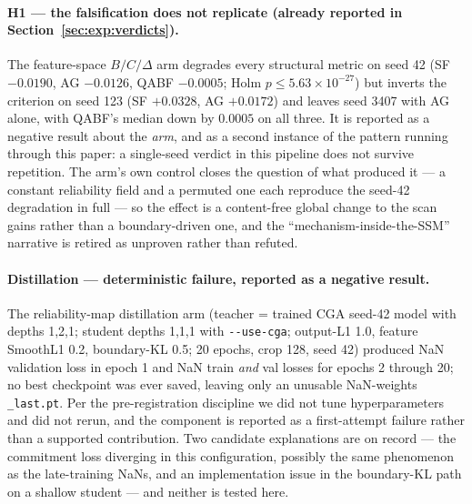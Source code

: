\documentclass[pdflatex,sn-mathphys-num]{sn-jnl}
\theoremstyle{thmstyleone}%
\theoremstyle{thmstyletwo}%
\theoremstyle{thmstylethree}%
\begin{document}
\paragraph{H1 --- the falsification does not replicate (already reported in Section~\ref{sec:exp:verdicts}).} The feature-space $B/C/\Delta$ arm degrades every structural metric on seed 42 (SF $-0.0190$, AG $-0.0126$, QABF $-0.0005$; Holm $p \leq 5.63\times10^{-27}$) but inverts the criterion on seed 123 (SF $+0.0328$, AG $+0.0172$) and leaves seed 3407 with AG alone, with QABF's median down by $0.0005$ on all three. It is reported as a negative result about the \emph{arm}, and as a second instance of the pattern running through this paper: a single-seed verdict in this pipeline does not survive repetition. The arm's own control closes the question of what produced it --- a constant reliability field and a permuted one each reproduce the seed-42 degradation in full --- so the effect is a content-free global change to the scan gains rather than a boundary-driven one, and the ``mechanism-inside-the-SSM'' narrative is retired as unproven rather than refuted.

\paragraph{Distillation --- deterministic failure, reported as a negative result.} The reliability-map distillation arm (teacher = trained CGA seed-42 model with depths 1,2,1; student depths 1,1,1 with \texttt{-{}-use-cga}; output-L1 1.0, feature SmoothL1 0.2, boundary-KL 0.5; 20 epochs, crop 128, seed 42) produced NaN validation loss in epoch 1 and NaN train \emph{and} val losses for epochs 2 through 20; no best checkpoint was ever saved, leaving only an unusable NaN-weights \texttt{\_last.pt}. Per the pre-registration discipline we did not tune hyperparameters and did not rerun, and the component is reported as a first-attempt failure rather than a supported contribution. Two candidate explanations are on record --- the commitment loss diverging in this configuration, possibly the same phenomenon as the late-training NaNs, and an implementation issue in the boundary-KL path on a shallow student --- and neither is tested here.
\end{document}
